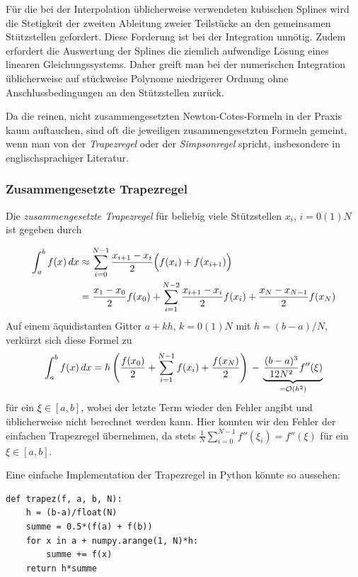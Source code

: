 Für die bei der Interpolation üblicherweise verwendeten kubischen
Splines wird die Stetigkeit der zweiten Ableitung zweier Teilstücke an
den gemeinsamen Stützstellen gefordert.  Diese Forderung ist bei der
Integration unnötig.  Zudem erfordert die Auswertung der Splines die
ziemlich aufwendige Lösung eines linearen Gleichungssystems.  Daher
greift man bei der numerischen Integration üblicherweise auf
stückweise Polynome niedrigerer Ordnung ohne Anschlussbedingungen an
den Stützstellen zurück.

Da die reinen, nicht zusammengesetzten Newton-Cotes-Formeln in der
Praxis kaum auftauchen, sind oft die jeweiligen zusammengesetzten
Formeln gemeint, wenn man von der \emph{Trapezregel} oder der
\emph{Simpsonregel} spricht, insbesondere in englischsprachiger
Literatur.

\subsubsection{Zusammengesetzte Trapezregel}
\begin{minipage}[t]{0.74\linewidth}
  Die \emph{zusammengesetzte Trapezregel} für beliebig viele
  Stützstellen $x_i$, $i=0(1)N$ ist gegeben durch
\end{minipage}
\begin{align}
  \label{eq:trapezzusammen}
  \int_a^b f(x)\, dx &\approx \sum_{i=0}^{N-1} \frac{x_{i+1} -
    x_i}{2}\Bigl(f(x_i) + f(x_{i+1})\Bigr)\nonumber\\
  &= \frac{x_1-x_0}{2}f(x_0) + \sum_{i=1}^{N-2} \frac{x_{i+1} - x_{i}}{2}
  f(x_i) + \frac{x_N-x_{N-1}}{2}f(x_N)
\end{align}
Auf einem äquidistanten Gitter $a + kh$,
$k=0(1)N$ mit $h=(b-a)/N$, verkürzt sich diese Formel zu
\begin{equation}
  \int_a^b f(x)\, dx =
  h\left(\frac{f(x_0)}{2} + \sum_{i=1}^{N-1} f(x_i) +
    \frac{f(x_N)}{2}\right)
  \,-\, \underbrace{\frac{(b-a)^3}{12 N^2}f''(\xi)}_{=\mathcal O(h^2)}
\end{equation}
für ein $\xi\in [a,b]$, wobei der letzte Term wieder den Fehler angibt
und üblicherweise nicht berechnet werden kann. Hier konnten wir den
Fehler der einfachen Trapezregel übernehmen, da stets $\frac{1}{N}
\sum_{i=0}^{N-1} f''(\xi_i) = f''(\xi)$ für ein $\xi\in[a,b]$.

Eine einfache Implementation der Trapezregel in Python könnte so
aussehen:
\begin{lstlisting}
def trapez(f, a, b, N):
    h = (b-a)/float(N)
    summe = 0.5*(f(a) + f(b))
    for x in a + numpy.arange(1, N)*h:
        summe += f(x)
    return h*summe
\end{lstlisting}

